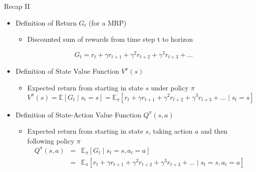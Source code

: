 \documentclass[aspectratio=169]{../latex_main/tntbeamer}  %
\begin{document}
\begin{frame}[c]{Recap II}

\begin{itemize}
	\item Definition of Return $G_t$ (for a MRP)
	\begin{itemize}
		\item Discounted sum of rewards from time step t to horizon
	\end{itemize}	
$$ G_t = r_t + \gamma r_{t+1} + \gamma^2 r_{t+2} + \gamma^3 r_{t+3} + \ldots$$

	\medskip
	\pause
	\item Definition of State Value Function $V^\pi (s) $
	\begin{itemize}
		\item Expected return from starting in state $s$ under policy $\pi$
		$$V^\pi (s) = \mathbb{E} [G_t \mid s_t = s] = \mathbb{E}_\pi [r_t + \gamma r_{t+1} + \gamma^2 r_{t+2} + \gamma^3 r_{t+3} + \ldots \mid s_t = s] $$
	\end{itemize}
	\medskip
	\pause
	\item Definition of State-Action Value Function $Q^\pi (s,a)$
	\begin{itemize}
	\item Expected return from starting in state $s$, taking action $a$ and then following
	policy $\pi$
	\begin{eqnarray}
	Q^\pi (s,a) &=& \mathbb{E}_{\pi}[G_t \mid s_t = s, a_t = a]  \nonumber \\
	&=& \mathbb{E}_{\pi}  [r_t + \gamma r_{t+1} + \gamma^2 r_{t+2} + \gamma^3 r_{t+3} + \ldots \mid s_t = s, a_t = a]\nonumber
	\end{eqnarray}

	
	\end{itemize}

\end{itemize}


\end{frame}
\end{document}
